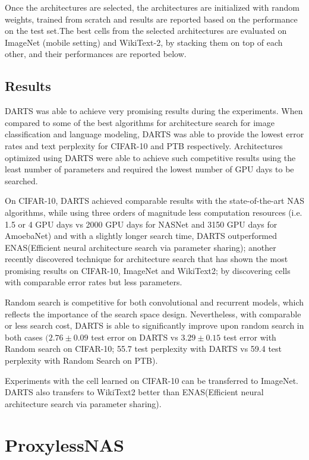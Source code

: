 \documentclass{ieee}
\begin{document}
Once the architectures are selected, the architectures are initialized with random weights, trained from scratch and results are reported based on the performance on the test set.The best cells from the selected architectures are evaluated on ImageNet (mobile setting) and WikiText-2, by stacking them on top of each other, and their performances are reported below.


\subsection{Results}
DARTS was able to achieve very promising results during the experiments. When compared to some of the best algorithms for architecture search for image classification and language modeling, DARTS was able to provide the lowest error rates and text perplexity for CIFAR-10 and PTB respectively. Architectures optimized using DARTS were able to achieve such competitive results using the least number of parameters and required the lowest number of GPU days to be searched.

On CIFAR-10, DARTS achieved comparable results with the state-of-the-art NAS algorithms, while using three orders of magnitude less computation resources (i.e. 1.5 or 4 GPU days vs 2000 GPU days for NASNet and 3150 GPU days for AmoebaNet) and with a slightly longer search time, DARTS outperformed ENAS(Efficient neural architecture search via parameter sharing); another recently discovered technique for architecture search that has shown the most promising results on CIFAR-10, ImageNet and WikiText2; by discovering cells with comparable error rates but less parameters.

Random search is competitive for both convolutional and recurrent models, which reflects the importance of the search space design. Nevertheless, with comparable or less search cost, DARTS is able to significantly improve upon random search in both cases $(2.76 \pm 0.09$  test error on DARTS vs $3.29 \pm 0.15$ test error with Random search on CIFAR-10; 55.7 test perplexity with DARTS vs 59.4 test perplexity with Random Search on PTB). 

Experiments with the cell learned on CIFAR-10 can be transferred to ImageNet. DARTS also transfers to WikiText2 better than ENAS(Efficient neural architecture search via parameter sharing).

\section{ProxylessNAS}
\end{document}

